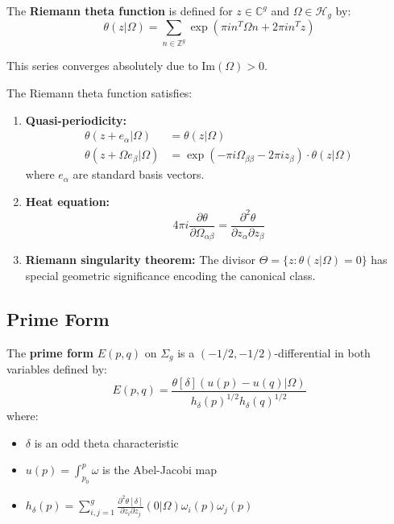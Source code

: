 \begin{definition}
\label{def:riemann-theta}
The \textbf{Riemann theta function} is defined for $z \in \mathbb{C}^g$ and $\Omega \in \mathcal{H}_g$ by:
\begin{equation}
\theta(z|\Omega) = \sum_{n \in \mathbb{Z}^g} \exp\left(\pi i n^T \Omega n + 2\pi i n^T z\right)
\end{equation}

This series converges absolutely due to Im$(\Omega) > 0$.
\end{definition}

\begin{theorem}
\label{thm:theta-properties}
The Riemann theta function satisfies:
\begin{enumerate}
\item \textbf{Quasi-periodicity:}
\begin{align}
\theta(z + e_\alpha|\Omega) &= \theta(z|\Omega)\\
\theta(z + \Omega e_\beta|\Omega) &= \exp(-\pi i \Omega_{\beta\beta} - 2\pi i z_\beta) \cdot \theta(z|\Omega)
\end{align}
where $e_\alpha$ are standard basis vectors.

\item \textbf{Heat equation:}
\begin{equation}
4\pi i \frac{\partial \theta}{\partial \Omega_{\alpha\beta}} = \frac{\partial^2 \theta}{\partial z_\alpha \partial z_\beta}
\end{equation}

\item \textbf{Riemann singularity theorem:} The divisor $\Theta = \{z : \theta(z|\Omega) = 0\}$ has special geometric significance encoding the canonical class.
\end{enumerate}
\end{theorem}

\subsection{Prime Form}

\begin{definition}
\label{def:prime-form}
The \textbf{prime form} $E(p, q)$ on $\Sigma_g$ is a $(-1/2, -1/2)$-differential in both variables defined by:
\begin{equation}
E(p, q) = \frac{\theta[\delta](u(p) - u(q)|\Omega)}{h_\delta(p)^{1/2} h_\delta(q)^{1/2}}
\end{equation}
where:
\begin{itemize}
\item $\delta$ is an odd theta characteristic
\item $u(p) = \int_{p_0}^p \omega$ is the Abel-Jacobi map
\item $h_\delta(p) = \sum_{i,j=1}^g \frac{\partial^2 \theta[\delta]}{\partial z_i \partial z_j}(0|\Omega) \omega_i(p) \omega_j(p)$
\end{itemize}
\end{definition}

